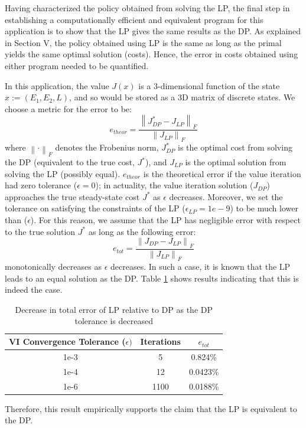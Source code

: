 \documentclass[conference]{IEEEtran}
\newcommand{\norm}[1]{\left\lVert#1\right\rVert}
\begin{document}
Having characterized the policy obtained from solving the LP, the final step in establishing a computationally efficient and equivalent program for this application is to show that the LP gives the same results as the DP. As explained in Section V, the policy obtained using LP is the same as long as the primal yields the same optimal solution (costs). Hence, the error in costs obtained using either program needed to be quantified.

In this application, the value $J(x)$ is a 3-dimensional function of the state $x:=(E_{1},E_{2},L)$, and so would be stored as a 3D matrix of discrete states. We choose a metric for the error to be:
\begin{displaymath}
    e_{theor}=\frac{\norm{J^{*}_{DP}-J_{LP}}_{F}}{\norm{J_{LP}}_{F}}
\end{displaymath} where $\norm{\cdot}_{F}$ denotes the Frobenius norm, $J^{*}_{DP}$ is the optimal cost from solving the DP (equivalent to the true cost, $J^{*}$), and $J_{LP}$ is the optimal solution from solving the LP (possibly equal). $e_{theor}$ is the theoretical error if the value iteration had zero tolerance ($\epsilon=0$); in actuality, the value iteration solution ($J_{DP}$) approaches the true steady-state cost $J^{*}$ as $\epsilon$ decreases.
Moreover, we set the tolerance on satisfying the constraints of the LP ($\epsilon_{LP}=1e-9$) to be much lower than ($\epsilon$). For this reason, we assume that the LP has negligible error with respect to the true solution $J^{*}$ as long as the following error:
\begin{displaymath}
    e_{tot}=\frac{\norm{J_{DP}-J_{LP}}_{F}}{\norm{J_{LP}}_{F}}
\end{displaymath} monotonically decreases as $\epsilon$ decreases. In such a case, it is known that the LP leads to an equal solution as the DP. Table \ref{tab:Table1} shows results indicating that this is indeed the case.
\begin{table}%
	\begin{center}
		\begin{tabular}{|c|c|c|}
			\hline
			\textbf{VI Convergence Tolerance ($\epsilon)$}&\textbf{Iterations}&\textbf{$e_{tot}$} \\
			\hline
			1e-3& 5 & 0.824\% \\
			\hline
			1e-4& 12 & 0.0423\% \\
			\hline
			1e-6& 1100 & 0.0188\% \\
			\hline
		\end{tabular}
	\end{center}
	\caption{Decrease in total error of LP relative to DP as the DP tolerance is decreased}
	\label{tab:Table1}
\end{table} Therefore, this result empirically supports the claim that the LP is equivalent to the DP.
\end{document}
